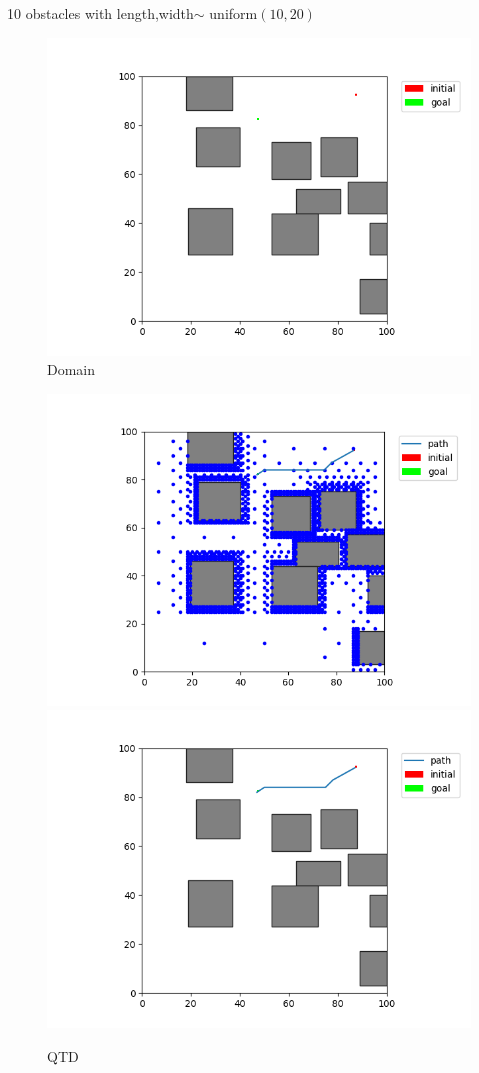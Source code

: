 \documentclass[12pt,a4paper]{article}
\begin{document}
10 obstacles with length,width$\sim$ uniform$(10,20)$\\
\begin{figure}[H]
\centering
	\includegraphics[scale=.40]{10_20_emp}
\caption{Domain}
\end{figure}

\begin{figure}[H]
\centering
	\includegraphics[scale=.40]{10_20_qtd_state}
    \includegraphics[scale=.40]{10_20_qtd_path}
\caption{QTD}
\end{figure}
\end{document}

